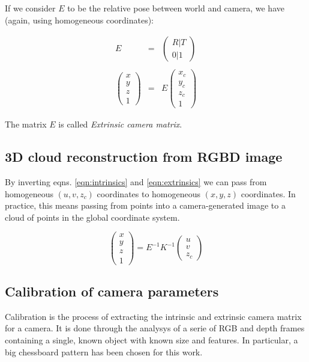 If we consider $E$ to be the relative pose between world and camera, we have
(again, using homogeneous coordinates):

\begin{eqnarray}
  E&=&\left(
  \begin{array}{c}
  R | T \\
  0 | 1
\end{array}
\right) \\ 
\nonumber \\
\left(\begin{array}{c}x\\y\\z\\1\end{array}\right)
  &=&
  E
\left(\begin{array}{c}x_c\\y_c\\z_c\\1\end{array}\right) \label{eqn:extrinsics}
\end{eqnarray}

The matrix $E$ is called \emph{Extrinsic camera matrix}.

\subsection{3D cloud reconstruction from RGBD image}
\label{sec:cloud-reconstruction}
By inverting eqns. \ref{eqn:intrinsics} and \ref{eqn:extrinsics} we can pass from homogeneous
$(u,v,z_c)$ coordinates to homogeneous $(x,y,z)$ coordinates. In practice, this
means passing from points into a camera-generated image to a cloud of points in
the global coordinate system.

\begin{equation}
  \left(\begin{array}{c}x\\y\\z\\1\end{array}\right)
  =E^{-1}K^{-1}\left(\begin{array}{c}u\\v\\z_c\end{array}\right)
\end{equation}

\subsection{Calibration of camera parameters} \label{sec:camera-calibration}
Calibration is the process of extracting the intrinsic and extrinsic
camera matrix for a camera. It is done through the analysys of a serie of RGB and depth
frames containing a single, known object with known size and features. In
particular, a big chessboard pattern has been chosen for this work.

